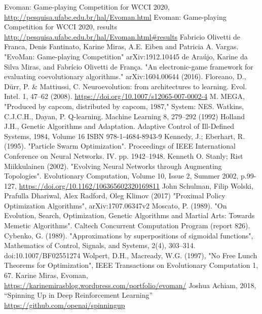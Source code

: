\documentclass[conference]{IEEEtran}
\begin{document}
    \begin{thebibliography}{00}
     Evoman: Game-playing Competition for WCCI 2020, \url{http://pesquisa.ufabc.edu.br/hal/Evoman.html}
     Evoman: Game-playing Competition for WCCI 2020, results \url{http://pesquisa.ufabc.edu.br/hal/Evoman.html#results}
     Fabricio Olivetti de Franca, Denis Fantinato, Karine Miras, A.E. Eiben and Patricia A. Vargas.
      "EvoMan: Game-playing Competition" arXiv:1912.10445
     de Araújo, Karine da Silva Miras, and Fabrício Olivetti de França.
      "An electronic-game framework for evaluating coevolutionary algorithms." arXiv:1604.00644 (2016).
     Floreano, D., Dürr, P. \& Mattiussi, C. Neuroevolution: from architectures to learning. Evol. Intel. 1, 47–62 (2008). \url{https://doi.org/10.1007/s12065-007-0002-4}
     M. MEGA, "Produced by capcom, distributed by capcom, 1987," System: NES.
     Watkins, C.J.C.H., Dayan, P. Q-learning. Machine Learning 8, 279–292 (1992)
     Holland J.H., Genetic Algorithms and Adaptation. Adaptive Control of Ill-Defined Systems, 1984, Volume 16 ISBN 978-1-4684-8943-9
     Kennedy, J.; Eberhart, R. (1995). "Particle Swarm Optimization". Proceedings of IEEE International Conference on Neural Networks. IV. pp. 1942–1948.
     Kenneth O. Stanly; Rist Miikkulainen (2002). "Evolving Neural Networks through Augmenting Topologies". Evolutionary Computation, Volume 10, Issue 2, Summer 2002, p.99-127, \url{https://doi.org/10.1162/106365602320169811}
     John Schulman, Filip Wolski, Prafulla Dhariwal, Alex Radford, Oleg Klimov (2017) "Proximal Policy Optimization Algorithms", arXiv:1707.06347v2
     Moscato, P. (1989). "On Evolution, Search, Optimization, Genetic Algorithms and Martial Arts: Towards Memetic Algorithms". Caltech Concurrent Computation Program (report 826).
     Cybenko, G. (1989). "Approximations by superpositions of sigmoidal functions", Mathematics of Control, Signals, and Systems, 2(4), 303–314. doi:10.1007/BF02551274
     Wolpert, D.H., Macready, W.G. (1997), "No Free Lunch Theorems for Optimization", IEEE Transactions on Evolutionary Computation 1, 67.
     Karine Miras, Evoman, \url{https://karinemirasblog.wordpress.com/portfolio/evoman/}
     Joshua Achiam, 2018, ``Spinning Up in Deep Reinforcement Learning'' \url{https://github.com/openai/spinningup}
    \end{thebibliography}
\end{document}
